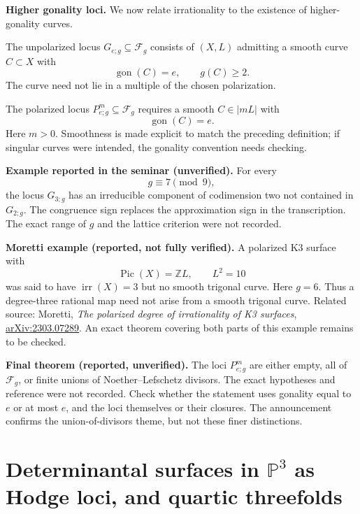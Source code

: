 \medskip\noindent
{\bf Higher gonality loci.}
We now relate irrationality to the
existence of higher-gonality curves.

The unpolarized locus
$G_{e;g}\subseteq\mathcal{F}_g$
consists of $(X,L)$ admitting a smooth
curve $C\subset X$ with
$$
\operatorname{gon}(C)=e,\qquad g(C)\geq2.
$$
The curve need not lie in a multiple
of the chosen polarization.

The polarized locus
$P^m_{e;g}\subseteq\mathcal{F}_g$
requires a smooth $C\in|mL|$ with
$$
\operatorname{gon}(C)=e.
$$
Here $m>0$. Smoothness is made explicit
to match the preceding definition;
if singular curves were intended, the
gonality convention needs checking.

\medskip\noindent
{\bf Example reported in the seminar
(unverified).}
For every
$$
g\equiv7\pmod{9},
$$
the locus $G_{3;g}$ has an irreducible
component of codimension two not
contained in $G_{2;g}$.
The congruence sign replaces the
approximation sign in the transcription.
The exact range of $g$ and the lattice
criterion were not recorded.

\medskip\noindent
{\bf Moretti example
(reported, not fully verified).}
A polarized K3 surface with
$$
\operatorname{Pic}(X)=\mathbb{Z}L,
\qquad L^2=10
$$
was said to have
$\operatorname{irr}(X)=3$ but no
smooth trigonal curve. Here $g=6$.
Thus a degree-three rational map need
not arise from a smooth trigonal curve.
Related source: Moretti,
{\it The polarized degree of
irrationality of K3 surfaces},
\href{https://arxiv.org/abs/2303.07289}
{arXiv:2303.07289}.
An exact theorem covering both parts
of this example remains to be checked.

\medskip\noindent
{\bf Final theorem
(reported, unverified).}
The loci $P^m_{e;g}$ are either empty,
all of $\mathcal{F}_g$, or finite
unions of Noether--Lefschetz divisors.
The exact hypotheses and reference
were not recorded. Check whether the
statement uses gonality equal to $e$
or at most $e$, and the loci themselves
or their closures. The announcement
confirms the union-of-divisors theme,
but not these finer distinctions.



\section{Determinantal surfaces in
$\mathbb{P}^3$ as Hodge loci, and quartic
threefolds}
\label{section-lozano-determinantal-nl}

